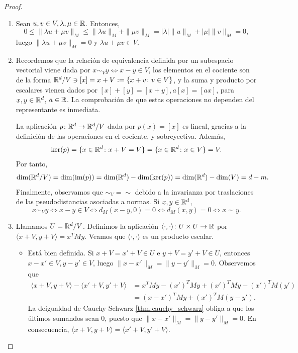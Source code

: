 \begin{proof}~
    \begin{enumerate}
        \item Sean $u, v \in V, \lambda, \mu \in \mathbb{R}$. Entonces,
        \[0 \le \|\lambda u + \mu v \|_M \le \|\lambda u \|_M+\|\mu v\|_M = |\lambda|\|u\|_M+|\mu|\|v\|_M = 0, \]
        luego $\|\lambda u + \mu v\|_M = 0$ y $\lambda u + \mu v \in V$.

        \item Recordemos que la relación de equivalencia definida por un subespacio vectorial viene dada por $x \sim_V y \iff x - y \in V$, los elementos en el cociente son de la forma $\mathbb{R}^d / V \ni  [x] = x+ V := \{x+v \colon v \in V\}$, y la suma y producto por escalares vienen dados por $[x] + [y] = [x+y], a[x] = [ax]$, para $x,y \in \mathbb{R}^d$, $a \in \mathbb{R}$. La comprobación de que estas operaciones no dependen del representante es inmediata. 

        La aplicación $p\colon \mathbb{R}^d \to \mathbb{R}^d/V$ dada por $p(x) = [x]$ es lineal, gracias a la definición de las operaciones en el cociente, y sobreyectiva. Además,
        \[\ker(p) = \{x \in \mathbb{R}^d \colon x + V = V \} = \{x \in \mathbb{R}^d \colon x \in V  \} = V. \]
        Por tanto,
        \[ \dim(\mathbb{R}^d/V) = \dim(\operatorname{im}(p)) = \dim(\mathbb{R}^d) - \dim(\ker(p)) = \dim(\mathbb{R}^d) - \dim(V) = d - m.\]
        Finalmente, observamos que $\sim_{V} = \sim$ debido a la invarianza por traslaciones de las pseudodistancias asociadas a normas. Si $x,y \in \mathbb{R}^d$,
        \[ x \sim_{V} y \iff x-y \in V \iff d_M(x-y,0) = 0 \iff d_M(x,y) = 0  \iff x \sim y.\]

        \item Llamamos $U = \mathbb{R}^d/V$. Definimos la aplicación $\langle \cdot, \cdot \rangle \colon U \times U \to \mathbb{R}$ por $\langle x +V, y+V \rangle = x^TMy$. Veamos que $\langle \cdot, \cdot \rangle$ es un producto escalar.
        \begin{itemize}
            \item Está bien definida. Si $x+V = x'+V \in U$ e $y+V=y'+V \in U$, entonces $x-x' \in V, y-y' \in V$, luego $\|x-x'\|_M = \|y-y'\|_M = 0$. Observemos que
            \begin{align*}
            \langle x+V, y+V \rangle - \langle x' + V, y' + V \rangle &= x^TMy - (x')^TMy + (x')^TMy - (x')^TM(y') \\
                                &= (x - x')^TMy + (x')^TM(y - y').  
            \end{align*}
            La deigualdad de Cauchy-Schwarz \ref{thm:cauchy_schwarz} obliga a que los últimos sumandos sean 0, puesto que $\|x-x'\|_M = \|y-y'\|_M = 0$. En consecuencia, $\langle x+V, y+V \rangle = \langle x' + V, y' + V \rangle$.


\end{itemize}
\end{enumerate}
\end{proof}
